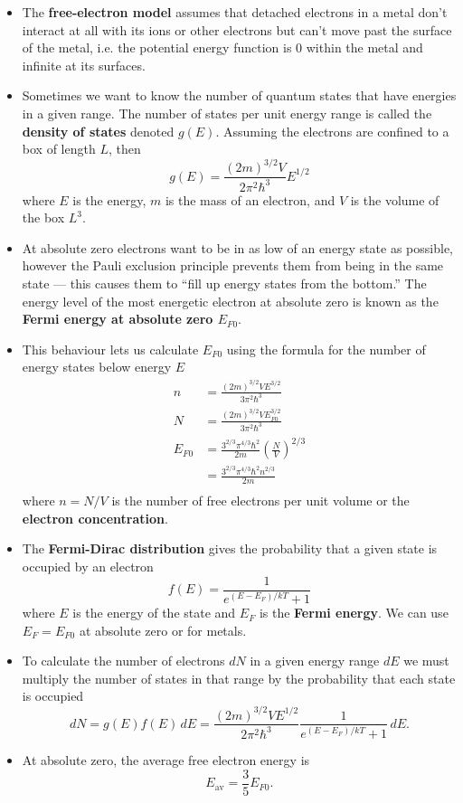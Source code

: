 \documentclass{article}
\begin{document}
\begin{itemize}
  \item The \textbf{free-electron model} assumes that detached electrons in a metal don't interact at all with its ions or other electrons but can't move past the surface of the metal, i.e. the potential energy function is $0$ within the metal and infinite at its surfaces.

  \item Sometimes we want to know the number of quantum states that have energies in a given range. The number of states per unit energy range is called the \textbf{density of states} denoted $g(E)$. Assuming the electrons are confined to a box of length $L$, then \[g(E) = \frac{(2 m)^{3 / 2} V}{2 \pi^2 \hbar^3} E^{1 / 2}\] where $E$ is the energy, $m$ is the mass of an electron, and $V$ is the volume of the box $L^3$.

  \item At absolute zero electrons want to be in as low of an energy state as possible, however the Pauli exclusion principle prevents them from being in the same state — this causes them to ``fill up energy states from the bottom.'' The energy level of the most energetic electron at absolute zero is known as the \textbf{Fermi energy at absolute zero $E_{F 0}$}.

  \item This behaviour lets us calculate $E_{F 0}$ using the formula for the number of energy states below energy $E$ \begin{align*}
          n       & = \frac{(2 m)^{3 / 2} V E^{3 / 2}}{3 \pi^2 \hbar^3}                            \\
          N       & = \frac{(2 m)^{3 / 2} V E_{F 0}^{3 / 2}}{3 \pi^2 \hbar^3}                      \\
          E_{F 0} & = \frac{3^{2 / 3} \pi^{4 / 3} \hbar^2}{2 m} \left( \frac{N}{V} \right)^{2 / 3} \\
                  & = \frac{3^{2 / 3} \pi^{4 / 3} \hbar^2 n^{2 / 3}}{2 m}                          \\
        \end{align*} where $n = N / V$ is the number of free electrons per unit volume or the \textbf{electron concentration}.

  \item The \textbf{Fermi-Dirac distribution} gives the probability that a given state is occupied by an electron \[f(E) = \frac{1}{e^{(E - E_F) / k T} + 1}\] where $E$ is the energy of the state and $E_F$ is the \textbf{Fermi energy}. We can use $E_F = E_{F0}$ at absolute zero or for metals.

  \item To calculate the number of electrons $d N$ in a given energy range $d E$ we must multiply the number of states in that range by the probability that each state is occupied \[d N = g(E) f(E) \,d E = \frac{(2 m)^{3 / 2} V E^{1 / 2}}{2 \pi^2 \hbar^3} \frac{1}{e^{(E - E_F) / k T} + 1} \,d E.\]

  \item At absolute zero, the average free electron energy is \[E_\text{av} = \frac{3}{5} E_{F 0}.\]
\end{itemize}
\end{document}
